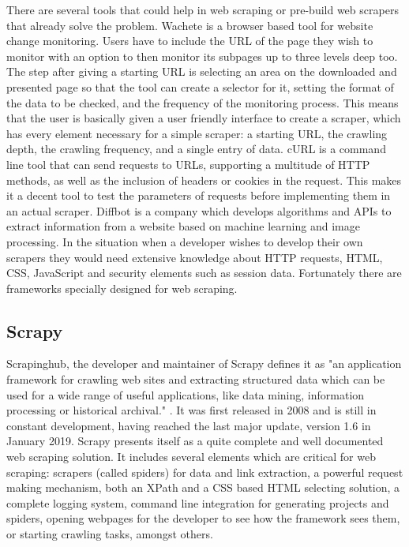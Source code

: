 \documentclass[12pt,a4paper,twoside]{report}
\begin{document}
There are several tools that could help in web scraping or pre-build web scrapers that already solve the problem. Wachete is a browser based tool for website change monitoring. Users have to include the URL of the page they wish to monitor with an option to then monitor its subpages up to three levels deep too. The step after giving a starting URL is selecting an area on the downloaded and presented page so that the tool can create a selector for it, setting the format of the data to be checked, and the frequency of the monitoring process. This means that the user is basically given a user friendly interface to create a scraper, which has every element necessary for a simple scraper: a starting URL, the crawling depth, the crawling frequency, and a single entry of data. cURL is a command line tool that can send requests to URLs, supporting a multitude of HTTP methods, as well as the inclusion of headers or cookies in the request. This makes it a decent tool to test the parameters of requests before implementing them in an actual scraper. Diffbot is a company which develops algorithms and APIs to extract information from a website based on machine learning and image processing. In the situation when a developer wishes to develop their own scrapers they would need extensive knowledge about HTTP requests, HTML, CSS, JavaScript and security elements such as session data. Fortunately there are frameworks specially designed for web scraping.


\subsection{Scrapy}

Scrapinghub, the developer and maintainer of Scrapy defines it as "an application framework for crawling web sites and extracting structured data which can be used for a wide range of useful applications, like data mining, information processing or historical archival." \cite{scrapy_docs}. It was first released in 2008 and is still in constant development, having reached the last major update, version 1.6 in January 2019. Scrapy presents itself as a quite complete and well documented web scraping solution. It includes several elements which are critical for web scraping: scrapers (called spiders) for data and link extraction, a powerful request making mechanism, both an XPath and a CSS based HTML selecting solution, a complete logging system, command line integration for generating projects and spiders, opening webpages for the developer to see how the framework sees them, or starting crawling tasks, amongst others.
\end{document}
